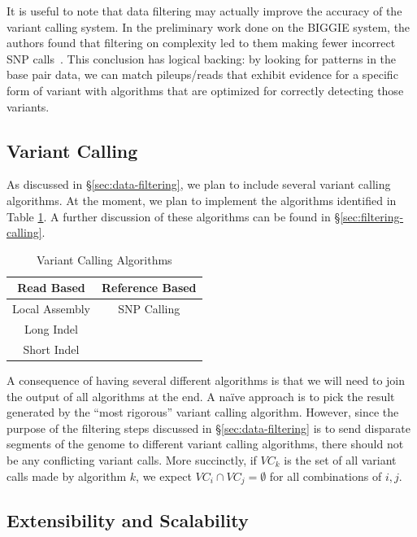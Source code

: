 \documentclass[11pt]{article}
\begin{document}
It is useful to note that data filtering may actually improve the accuracy of the variant calling system. In the preliminary work
done on the BIGGIE system, the authors found that filtering on complexity led to them making fewer incorrect SNP
calls~\cite{xia12}. This conclusion has logical backing: by looking for patterns in the base pair data, we can match
pileups/reads that exhibit evidence for a specific form of variant with algorithms that are optimized for correctly detecting
those variants.

\subsection{Variant Calling}
\label{sec:variant-calling}

As discussed in \S\ref{sec:data-filtering}, we plan to include several variant calling algorithms. At the moment, we plan to
implement the algorithms identified in Table \ref{tab:vc-algorithms}. A further discussion of these algorithms can be found
in \S\ref{sec:filtering-calling}.

\begin{table}[h]
\begin{center}
\caption{Variant Calling Algorithms}
\label{tab:vc-algorithms}
\begin{tabular}{| c | c |}
\hline
\bf Read Based & \bf Reference Based \\
\hline \hline
Local Assembly & SNP Calling \\
Long Indel & \\
Short Indel & \\
\hline
\end{tabular}
\end{center}
\end{table}

A consequence of having several different algorithms is that we will need to join the output of all algorithms at the end.
A na\"{i}ve approach is to pick the result generated by the ``most rigorous'' variant calling algorithm. However, since the
purpose of the filtering steps discussed in \S\ref{sec:data-filtering} is to send disparate segments of the genome to
different variant calling algorithms, there should not be any conflicting variant calls. More succinctly, if $VC_{k}$ is the
set of all variant calls made by algorithm $k$, we expect $VC_{i} \cap VC_{j} = \emptyset$ for all combinations of $i, j$.

\subsection{Extensibility and Scalability}
\label{sec:extensibility-and-scalability}
\end{document}
